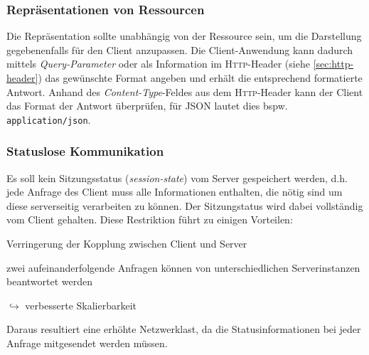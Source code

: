 \subsubsection{Repräsentationen von Ressourcen}
\label{sec:representationofresources}

Die Repräsentation sollte unabhängig von der Ressource sein, um die Darstellung gegebenenfalls für den Client anzupassen. 
Die Client-Anwendung kann dadurch mittels \emph{Query-Parameter} oder als Information im \textsc{Http}-Header (siehe \cref{sec:http-header}) das gewünschte Format angeben und erhält die entsprechend formatierte Antwort.
Anhand des \emph{Content-Type}-Feldes aus dem \textsc{Http}-Header kann der Client das Format der Antwort überprüfen, für \gls{JSON} lautet dies bspw. \texttt{application/json}.

\subsubsection{Statuslose Kommunikation}
\label{sec:stateless_communication}

Es soll kein Sitzungsstatus (\emph{session-state}) vom Server gespeichert werden, d.h. jede Anfrage des Client muss alle Informationen enthalten, die nötig sind um diese serverseitig verarbeiten zu können. Der Sitzungstatus wird dabei vollständig vom Client gehalten. 
Diese Restriktion führt zu einigen Vorteilen:
\begin{compactitem}
    \item Verringerung der Kopplung zwischen Client und Server
    \item zwei aufeinanderfolgende Anfragen können von unterschiedlichen Serverinstanzen beantwortet werden
    \item[$\hookrightarrow$] verbesserte Skalierbarkeit
\end{compactitem}

Daraus resultiert eine erhöhte Netzwerklast, da die Statusinformationen bei jeder Anfrage mitgesendet werden müssen.
